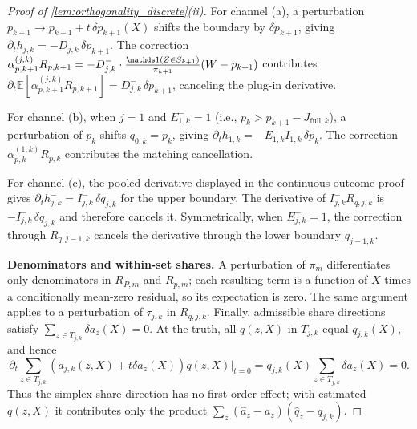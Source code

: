 \begin{proof}[Proof of \cref{lem:orthogonality_discrete}\textup{(ii)}]
For channel (a), a perturbation $p_{k+1} \to p_{k+1} + t\,\delta p_{k+1}(X)$ shifts the boundary by $\delta p_{k+1}$, giving $\partial_t h_{j,k}^- = -D_{j,k}^-\,\delta p_{k+1}$. The correction $\alpha_{p,k+1}^{(j,k)} R_{p,k+1} = -D_{j,k}^- \cdot \frac{\indicator(Z \in S_{k+1})}{\pi_{k+1}}(W - p_{k+1})$ contributes $\partial_t \mathbb{E}[\alpha_{p,k+1}^{(j,k)} R_{p,k+1}] = D_{j,k}^-\,\delta p_{k+1}$, canceling the plug-in derivative.

For channel (b), when $j = 1$ and $E_{1,k}^- = 1$ (i.e., $p_k > p_{k+1} - J_{\mathrm{full},k}$), a perturbation of $p_k$ shifts $q_{0,k} = p_k$, giving $\partial_t h_{1,k}^- = -E_{1,k}^- I_{1,k}^-\,\delta p_k$. The correction $\alpha_{p,k}^{(1,k)} R_{p,k}$ contributes the matching cancellation.

For channel (c), the pooled derivative displayed in the continuous-outcome proof gives $\partial_t h_{j,k}^-=I_{j,k}^-\,\delta q_{j,k}$ for the upper boundary. The derivative of $I_{j,k}^-R_{q,j,k}$ is $-I_{j,k}^-\,\delta q_{j,k}$ and therefore cancels it. Symmetrically, when $E_{j,k}^-=1$, the correction through $R_{q,j-1,k}$ cancels the derivative through the lower boundary $q_{j-1,k}$.

\textbf{Denominators and within-set shares.}
A perturbation of $\pi_m$ differentiates only denominators in $R_{P,m}$ and $R_{p,m}$; each resulting term is a function of $X$ times a conditionally mean-zero residual, so its expectation is zero. The same argument applies to a perturbation of $\tau_{j,k}$ in $R_{q,j,k}$. Finally, admissible share directions satisfy $\sum_{z\in T_{j,k}}\delta a_z(X)=0$. At the truth, all $q(z,X)$ in $T_{j,k}$ equal $q_{j,k}(X)$, and hence
\[
\partial_t\sum_{z\in T_{j,k}}(a_{j,k}(z,X)+t\delta a_z(X))q(z,X)\Big|_{t=0}
=q_{j,k}(X)\sum_{z\in T_{j,k}}\delta a_z(X)=0.
\]
Thus the simplex-share direction has no first-order effect; with estimated $q(z,X)$ it contributes only the product $\sum_z(\hat a_z-a_z)(\hat q_z-q_{j,k})$.


\end{proof}
